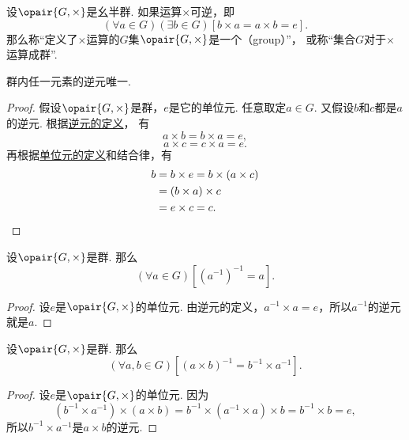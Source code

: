 \begin{definition}\label{definition:抽象代数.群的定义}
设\(\opair{G,\times}\)是幺半群.
如果运算\(\times\)可逆，即\begin{equation*}
	(\forall a \in G)(\exists b \in G)
	[b \times a = a \times b = e].
\end{equation*}
那么称“定义了\(\times\)运算的\(G\)集\(\opair{G,\times}\)是一个（group）”，
或称“集合\(G\)对于\(\times\)运算成群”.
\end{definition}

\begin{theorem}\label{theorem:抽象代数.群内任一元的逆元唯一}
群内任一元素的逆元唯一.
\begin{proof}
假设\(\opair{G,\times}\)是群，\(e\)是它的单位元.
任意取定\(a \in G\).
又假设\(b\)和\(c\)都是\(a\)的逆元.
根据\hyperref[definition:抽象代数.群的定义]{逆元的定义}，
有\begin{equation*}
    a \times b = b \times a = e,
\end{equation*}\begin{equation*}
    a \times c = c \times a = e.
\end{equation*}
再根据\hyperref[definition:抽象代数.幺半群的定义]{单位元的定义}和结合律，有\begin{align*}
    b &= b \times e
	= b \times (a \times c) \\
    &= (b \times a) \times c \\
    &= e \times c
	= c.
	\qedhere
\end{align*}
\end{proof}
\end{theorem}

\begin{theorem}\label{theorem:抽象代数.群内任一元的逆的逆是它本身}
设\(\opair{G,\times}\)是群.
那么\begin{equation*}
	(\forall a\in G)[(a^{-1})^{-1}=a].
\end{equation*}
\begin{proof}
设\(e\)是\(\opair{G,\times}\)的单位元.
由逆元的定义，\(a^{-1} \times a = e\)，所以\(a^{-1}\)的逆元就是\(a\).
\end{proof}
\end{theorem}

\begin{theorem}\label{theorem:抽象代数.群内元素的乘积的逆}
设\(\opair{G,\times}\)是群.
那么\begin{equation*}
	(\forall a,b\in G)[
		(a \times b)^{-1}
		= b^{-1} \times a^{-1}
	].
\end{equation*}
\begin{proof}
设\(e\)是\(\opair{G,\times}\)的单位元.
因为\begin{equation*}
	(b^{-1} \times a^{-1})\times(a \times b)
	= b^{-1} \times (a^{-1} \times a) \times b
	= b^{-1} \times b
	= e,
\end{equation*}
所以\(b^{-1} \times a^{-1}\)是\(a \times b\)的逆元.
\end{proof}
\end{theorem}

